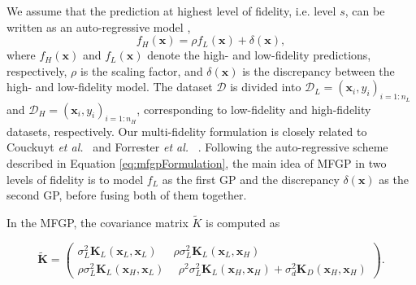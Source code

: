 \documentclass[%
 reprint,
aip,jcp
]{revtex4-1}
\begin{document}
We assume that the prediction at highest level of fidelity, i.e. level 
$s$, can be written as an auto-regressive model \cite{xiao2018extended}, 
\begin{equation}
\label{eq:mfgpFormulation}
f_H(\bm{x}) = \rho f_L(\bm{x}) + \delta (\bm{x}), 
\end{equation}
where $f_H(\bm{x})$ and $f_L(\bm{x})$ denote the high- and low-fidelity predictions, respectively, $\rho$ is the scaling factor, and $\delta(\bm{x})$ is the discrepancy between the high- and low-fidelity model. 
The dataset $\mathcal{D}$ is divided into $\mathcal{D}_L = (\bm{x}_i, y_i)_{i=1:n_L}$ and $\mathcal{D}_H = (\bm{x}_i, y_i)_{i=1:n_H}$, corresponding to low-fidelity and high-fidelity datasets, respectively. 
Our multi-fidelity formulation is closely related to Couckuyt \emph{et al.}~ \cite{couckuyt2012blind,couckuyt2013oodace,couckuyt2014oodace} and Forrester \emph{et al.}~ \cite{forrester2007multi}. 
Following the auto-regressive scheme described in Equation \ref{eq:mfgpFormulation}, the main idea of MFGP in two levels of fidelity is to model $f_L$ as the first GP and the discrepancy $\delta(\bm{x})$ as the second GP, before fusing both of them together. 

In the MFGP, the covariance matrix $\tilde{K}$ is computed as
\begin{widetext}
\begin{equation}
\label{eq:covarianceMF}
\tilde{\bm{K}} = \begin{pmatrix}
\sigma_L^2  \bm{K}_L (\bm{x}_L, \bm{x}_L) & \rho  \sigma_L^2  \bm{K}_L(\bm{x}_L, \bm{x}_H) \\ 
\rho  \sigma_L^2  \bm{K}_L(\bm{x}_H, \bm{x}_L) & ~~\rho^2  \sigma_L^2  \bm{K}_L(\bm{x}_H, \bm{x}_H) + \sigma_d^2  \bm{K}_D (\bm{x}_H,\bm{x}_H)
\end{pmatrix}.
\end{equation}
\end{widetext}
\end{document}

